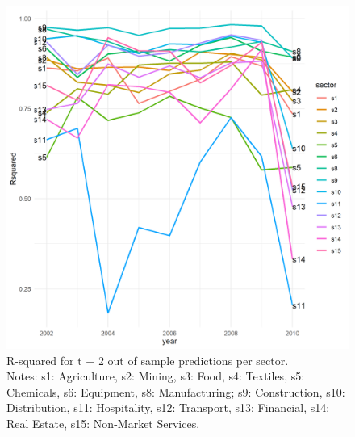 \documentclass[]{interact}
\theoremstyle{plain}%
\theoremstyle{definition}
\theoremstyle{remark}
\begin{document}
\begin{figure}[p]
\includegraphics[width=1\linewidth]{figures/sector_rsquared} \caption{\label{rsquared_sectors}R-squared for t + 2 out of sample predictions per sector.\\\hspace{\textwidth}\tiny Notes: s1: Agriculture, s2: Mining, s3: Food, s4: Textiles, s5: Chemicals, s6: Equipment, s8: Manufacturing; s9: Construction, s10: Distribution, s11: Hospitality, s12:  Transport, s13: Financial, s14: Real Estate, s15: Non-Market Services.}\label{fig:unnamed-chunk-9}
\end{figure}
\end{document}
